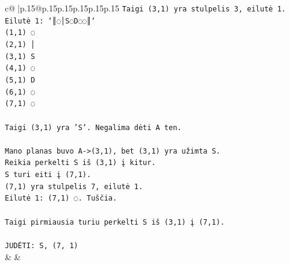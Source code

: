 \documentclass{article}
\begin{document}
{\begin{supertabular}{c@{$\;$}|p{.15\linewidth}@{}p{.15\linewidth}p{.15\linewidth}p{.15\linewidth}p{.15\linewidth}p{.15\linewidth}}
{{{\texttt{Taigi (3,1) yra stulpelis 3, eilutė 1.} \\
\texttt{Eilutė 1: `║◌│S◌D◌◌║`} \\
\texttt{(1,1) ◌} \\
\texttt{(2,1) │} \\
\texttt{(3,1) S} \\
\texttt{(4,1) ◌} \\
\texttt{(5,1) D} \\
\texttt{(6,1) ◌} \\
\texttt{(7,1) ◌} \\
\\ 
\texttt{Taigi (3,1) yra 'S'. Negalima dėti A ten.} \\
\\ 
\texttt{Mano planas buvo A{-}>(3,1), bet (3,1) yra užimta S.} \\
\texttt{Reikia perkelti S iš (3,1) į kitur.} \\
\texttt{S turi eiti į (7,1).} \\
\texttt{(7,1) yra stulpelis 7, eilutė 1.} \\
\texttt{Eilutė 1: (7,1) ◌. Tuščia.} \\
\\ 
\texttt{Taigi pirmiausia turiu perkelti S iš (3,1) į (7,1).} \\
\\ 
\texttt{JUDĖTI: S, (7, 1)} \\
            }
        }
    }
    & & \\ \\


\end{supertabular}}
\end{document}
